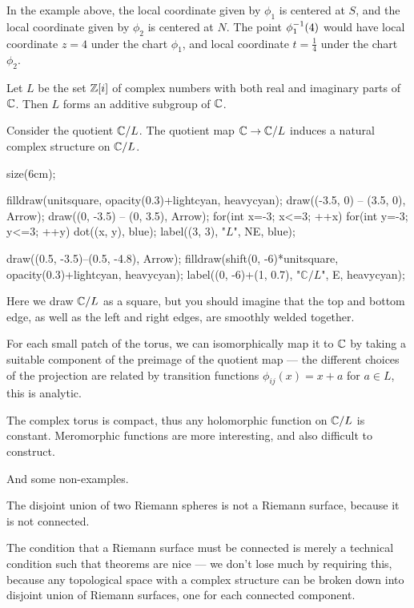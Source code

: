 In the example above, the local coordinate given by $\phi_1$ is centered at $S$, and the local
coordinate given by $\phi_2$ is centered at $N$.
The point $\phi_1^{-1}(4)$ would have local coordinate $z = 4$ under the chart $\phi_1$, and
local coordinate $t = \frac{1}{4}$ under the chart $\phi_2$.

\begin{example}
	Let $L$ be the set $\mathbb Z[i]$ of complex numbers with both real and imaginary parts of $\mathbb C$.
	Then $L$ forms an additive subgroup of $\mathbb C$.

	Consider the quotient $\mathbb C/L$. The quotient map $\mathbb C \to \mathbb C/L$ induces a natural complex
	structure on $\mathbb C/L$.

	\begin{center}
		\begin{asy}
			size(6cm);

			filldraw(unitsquare, opacity(0.3)+lightcyan, heavycyan);
			draw((-3.5, 0) -- (3.5, 0), Arrow);
			draw((0, -3.5) -- (0, 3.5), Arrow);
			for(int x=-3; x<=3; ++x) for(int y=-3; y<=3; ++y) dot((x, y), blue);
			label((3, 3), "$L$", NE, blue);

			draw((0.5, -3.5)--(0.5, -4.8), Arrow);
			filldraw(shift(0, -6)*unitsquare, opacity(0.3)+lightcyan, heavycyan);
			label((0, -6)+(1, 0.7), "$\mathbb{C}/L$", E, heavycyan);
		\end{asy}
	\end{center}

	Here we draw $\mathbb C/L$ as a square, but you should imagine that the top and bottom edge, as well
	as the left and right edges, are smoothly welded together.

	For each small patch of the torus, we can isomorphically map it to $\mathbb C$ by taking a suitable
	component of the preimage of the quotient map --- the different choices of the projection are
	related by transition functions $\phi_{ij}(x) = x + a$ for $a \in L$, this is analytic.

	The complex torus is compact, thus any holomorphic function on $\mathbb C/L$ is constant. Meromorphic
	functions are more interesting, and also difficult to construct.
\end{example}

And some non-examples.
\begin{example}
	The disjoint union of two Riemann spheres is not a Riemann surface, because it is not connected.
\end{example}
The condition that a Riemann surface must be connected is merely a technical condition such that
theorems are nice --- we don't lose much by requiring this, because any topological space with a
complex structure can be broken down into disjoint union of Riemann surfaces, one for each connected
component.
